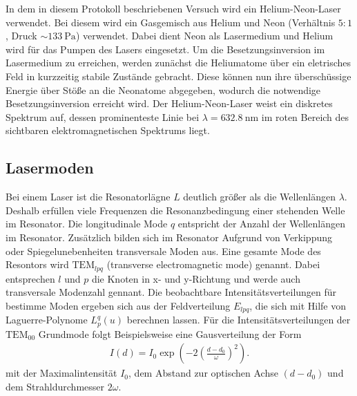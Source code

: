 In dem in diesem Protokoll beschriebenen
Versuch wird ein Helium-Neon-Laser verwendet.
Bei diesem wird ein Gasgemisch aus Helium und
Neon (Verhältnis $5:1$, Druck $\sim \SI{133}{\pascal}$) verwendet.
Dabei dient Neon als Lasermedium und Helium wird für das Pumpen
des Lasers eingesetzt. Um die Besetzungsinversion im Lasermedium
zu erreichen, werden zunächst die Heliumatome über ein
eletrisches Feld in kurzzeitig stabile Zustände gebracht.
Diese können nun ihre
überschüssige Energie über Stöße an die Neonatome abgegeben,
wodurch die notwendige Besetzungsinversion erreicht wird.
Der Helium-Neon-Laser weist ein diskretes Spektrum auf, dessen
prominenteste Linie bei $\lambda = \SI{632.8}{\nano\meter}$ im
roten Bereich des sichtbaren elektromagnetischen Spektrums liegt.






\subsection{Lasermoden}
\label{subsec:lasermoden}
Bei einem Laser ist die
Resonatorlägne $L$ deutlich größer
als die Wellenlängen $\lambda$. Deshalb erfüllen viele Frequenzen
die Resonanzbedingung einer stehenden Welle im Resonator.
Die longitudinale Mode $q$ entspricht der Anzahl der Wellenlängen
im Resonator. Zusätzlich bilden sich im Resonator
Aufgrund von Verkippung oder Spiegelunebenheiten
transversale Moden aus.
Eine gesamte Mode des Resontors wird
$\text{TEM}_{lpq}$ (transverse electromagnetic mode)
genannt. Dabei entsprechen $l$ und $p$ die Knoten in
x- und y-Richtung und werde auch
transversale Modenzahl gennant.
Die beobachtbare Intensitätsverteilungen für bestimme Moden
ergeben sich aus der Feldverteilung $E_{lpq}$, die
sich mit Hilfe von Laguerre-Polynome $L_p^q(u)$
berechnen lassen. Für
die Intensitätsverteilungen der $\text{TEM}_{00}$ Grundmode folgt Beispielsweise
eine Gausverteilung der Form
\begin{align}
I(d)=I_0\exp\left(-2\left(\frac{d-d_0}{\omega}\right)^2\right). \label{eqn:TEM00}
\end{align}
mit der Maximalintensität $I_0$, dem Abstand zur optischen Achse $(d-d_0)$
und dem Strahldurchmesser $2\omega$.
